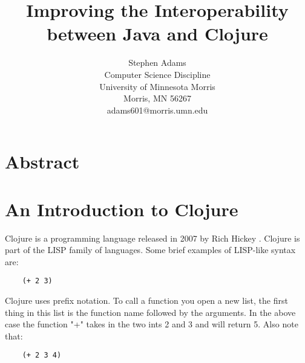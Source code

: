 \documentclass[12pt]{article}
\begin{document}
\pagestyle{plain}
%

\title{Improving the Interoperability between Java and Clojure}
%
%

\author{
Stephen Adams \\
Computer Science Discipline \\
University of Minnesota Morris\\
Morris, MN 56267\\
adams601@morris.umn.edu
}

\date{}

\maketitle
\thispagestyle{empty}

\section*{\centering Abstract}



\newpage
\setcounter{page}{1}

\section{An Introduction to Clojure}\label{sec:intro}
	Clojure is a programming language released in 2007 by Rich Hickey \cite{wiki}. Clojure is part of the LISP family of languages. Some brief examples of LISP-like syntax are:
	\begin{verbatim}
	(+ 2 3)
	\end{verbatim}
	Clojure uses prefix notation. To call a function you open a new list, the first thing in this list is the function name followed by the arguments. In the above case the function "+" takes in the two ints 2 and 3 and will return 5. Also note that:
	\begin{verbatim}
	(+ 2 3 4)
	\end{verbatim} 
	
\end{document}
